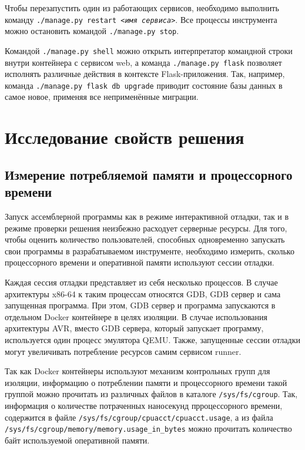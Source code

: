 \documentclass[a4paper,article,14pt]{extarticle}
\begin{document}
Чтобы перезапустить один из работающих сервисов, необходимо выполнить команду \texttt{./manage.py restart \textit{<имя сервиса>}}. Все процессы инструмента можно остановить командой \texttt{./manage.py stop}.

Командой \texttt{./manage.py shell} можно открыть интерпретатор командной строки внутри контейнера с сервисом web, а команда \texttt{./manage.py flask} позволяет исполнять различные действия в контексте Flask-приложения. Так, например, команда \texttt{./manage.py flask db upgrade} приводит состояние базы данных в самое новое, применяя все неприменённые миграции.

\pagebreak
\section{Исследование свойств решения}

\subsection{Измерение потребляемой памяти и процессорного времени}

Запуск ассемблерной программы как в режиме интерактивной отладки, так и в режиме проверки решения неизбежно расходует серверные ресурсы. Для того, чтобы оценить количество пользователей, способных одновременно запускать свои программы в разрабатываемом инструменте, необходимо измерить, сколько процессорного времени и оперативной памяти используют сессии отладки.

Каждая сессия отладки представляет из себя несколько процессов. В случае архитектуры x86-64 к таким процессам относятся GDB, GDB сервер и сама запущенная программа. При этом, GDB сервер и программа запускаются в отдельном Docker контейнере в целях изоляции. В случае использования архитектуры AVR, вместо GDB сервера, который запускает программу, используется один процесс эмулятора QEMU. Также, запущенные сессии отладки могут увеличивать потребление ресурсов самим сервисом runner.

Так как Docker контейнеры используют механизм контрольных групп для изоляции, информацию о потреблении памяти и процессорного времени такой группой можно прочитать из различных файлов в каталоге \texttt{/sys/fs/cgroup}. Так, информация о количестве потраченных наносекунд прроцессорного времени, содержится в файле \texttt{/sys/fs/cgroup/cpuacct/cpuacct.usage}, а из файла \texttt{/sys/fs/cgroup/memory/memory.usage\_in\_bytes} можно прочитать количество байт используемой оперативной памяти.
\end{document}
